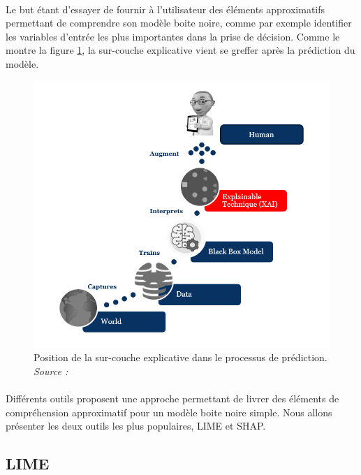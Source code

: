 \paragraph{}Le but étant d'essayer de fournir à l'utilisateur des éléments approximatifs permettant de comprendre son modèle boite noire, comme par exemple identifier les variables d'entrée les plus importantes dans la prise de décision. Comme le montre la figure \ref{explainCouche}, la sur-couche explicative vient se greffer après la prédiction du modèle.
\begin{figure}[h]
\centering
\includegraphics[scale=0.35]{src_img/explainCouche.png}
\caption{Position de la sur-couche explicative dans le processus de prédiction. \textit{Source : \cite{kdCouche}}}
\label{explainCouche}
\end{figure}
\paragraph{}Différents outils proposent une approche permettant de livrer des éléments de compréhension approximatif pour un modèle boite noire simple. Nous allons présenter les deux outils les plus populaires, LIME et SHAP.
\subsection{LIME}
